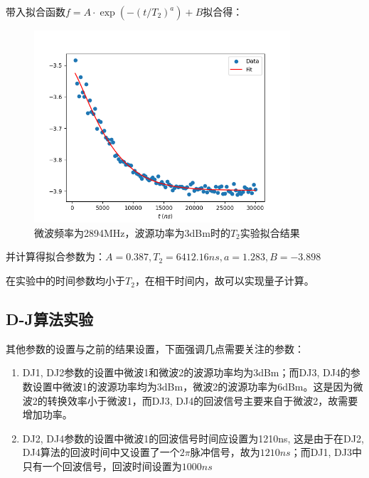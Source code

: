 \documentclass[a4paper,UTF8]{ctexart}
\begin{document}
带入拟合函数$f=A\cdot\exp(-(t/T_2)^a)+B$拟合得：

\begin{figure}[H]
    \centering
    \begin{minipage}[b]{0.9\textwidth}
        \centering
        \includegraphics[width=0.85\textwidth]{./1.png}
        \caption{微波频率为2894MHz，波源功率为3dBm时的$T_2$实验拟合结果}
    \end{minipage}
\end{figure}

并计算得拟合参数为：$A = 0.387, T_2 = 6412.16ns, a = 1.283, B = -3.898$

在实验中的时间参数均小于$T_2$，在相干时间内，故可以实现量子计算。

\subsection{D-J算法实验}

其他参数的设置与之前的结果设置，下面强调几点需要关注的参数：

\begin{enumerate}
    \item DJ1, DJ2参数的设置中微波1和微波2的波源功率均为3dBm；而DJ3, DJ4的参数设置中微波1的波源功率均为3dBm，微波2的波源功率为6dBm。这是因为微波2的转换效率小于微波1，而DJ3, DJ4的回波信号主要来自于微波2，故需要增加功率。
    \item DJ2, DJ4参数的设置中微波1的回波信号时间应设置为1210ns, 这是由于在DJ2, DJ4算法的回波时间中又设置了一个$2\pi$脉冲信号，故为$1210ns$；而DJ1, DJ3中只有一个回波信号，回波时间设置为$1000ns$
\end{enumerate}
\end{document}

